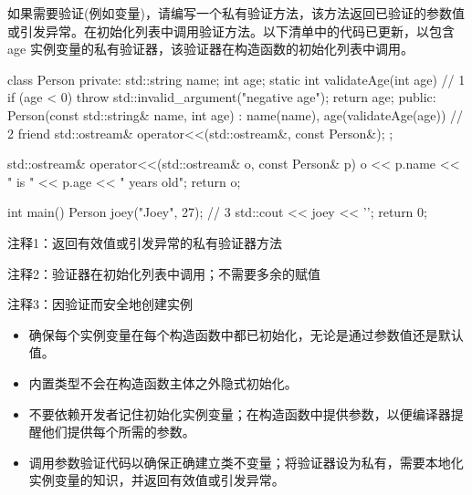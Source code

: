 如果需要验证(例如变量)，请编写一个私有验证方法，该方法返回已验证的参数值或引发异常。在初始化列表中调用验证方法。以下清单中的代码已更新，以包含 age 实例变量的私有验证器，该验证器在构造函数的初始化列表中调用。


\begin{cpp}
class Person {
private:
  std::string name;
  int age;
  static int validateAge(int age) { // 1
    if (age < 0)
      throw std::invalid_argument("negative age");
    return age;
  }
public:
  Person(const std::string& name, int age) :
  name(name), age(validateAge(age)) {} // 2
  friend std::ostream& operator<<(std::ostream&, const Person&);
};

std::ostream& operator<<(std::ostream& o, const Person& p) {
  o << p.name << " is " << p.age << " years old";
  return o;
}

int main() {
  Person joey("Joey", 27); // 3
  std::cout << joey << '\n';
  return 0;
}
\end{cpp}

{\footnotesize
注释1：返回有效值或引发异常的私有验证器方法

注释2：验证器在初始化列表中调用；不需要多余的赋值

注释3：因验证而安全地创建实例
}


\begin{itemize}
\item
确保每个实例变量在每个构造函数中都已初始化，无论是通过参数值还是默认值。

\item
内置类型不会在构造函数主体之外隐式初始化。

\item
不要依赖开发者记住初始化实例变量；在构造函数中提供参数，以便编译器提醒他们提供每个所需的参数。

\item
调用参数验证代码以确保正确建立类不变量；将验证器设为私有，需要本地化实例变量的知识，并返回有效值或引发异常。
\end{itemize}
